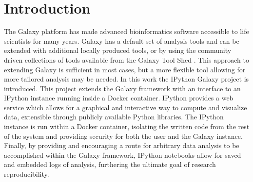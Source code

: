 \documentclass{bioinfo}
\begin{document}
\section{Introduction}


The Galaxy platform \citep{Blank2010,Giardine2005,Goecks2010} has made advanced bioinformatics software accessible
to life scientists for many years. Galaxy has a default set of analysis tools and can be extended with additional locally produced tools, or by using the community driven collections of tools available from the Galaxy Tool Shed
\citep{Blankenberg2014}. This approach to extending Galaxy is sufficient in most cases, but a more flexible tool allowing 
for more tailored analysis may be needed.
In this work the IPython Galaxy project is introduced. This project extends the Galaxy framework with an interface to an
IPython \citep{Perez2007} instance running inside a Docker container.
IPython provides a web service which allows for a graphical and interactive way to compute and visualize data, 
extensible through publicly available Python libraries. The IPython instance is run within a Docker container, 
isolating the written code from the rest of the system and providing security for both the user and the Galaxy instance. Finally, by providing and encouraging a route for arbitrary data analysis to be accomplished within the Galaxy framework, 
IPython notebooks allow for saved and embedded logs of analysis, furthering the ultimate goal of research reproducibility.
\end{document}
